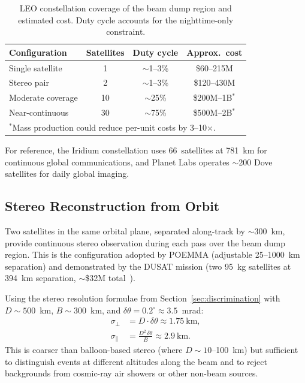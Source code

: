 \documentclass[11pt]{article}
\begin{document}
\begin{table}[h]
\centering
\small
\begin{tabular}{lccc}
\toprule
\textbf{Configuration} & \textbf{Satellites} &
\textbf{Duty cycle} & \textbf{Approx.\ cost} \\
\midrule
Single satellite     & 1  & $\sim$1--3\%  & \$60--215M \\
Stereo pair          & 2  & $\sim$1--3\%  & \$120--430M \\
Moderate coverage    & 10 & $\sim$25\%    & \$200M--1B$^*$ \\
Near-continuous      & 30 & $\sim$75\%    & \$500M--2B$^*$ \\
\bottomrule
\multicolumn{4}{l}{\footnotesize $^*$Mass production could reduce
per-unit costs by 3--10$\times$.}
\end{tabular}
\caption{LEO constellation coverage of the beam dump region
and estimated cost.  Duty cycle accounts for the nighttime-only
constraint.}
\label{tab:leo_coverage}
\end{table}

For reference, the Iridium constellation uses 66~satellites at 781~km
for continuous global communications, and Planet Labs operates
$\sim$200 Dove satellites for daily global imaging.

\subsection{Stereo Reconstruction from Orbit}

Two satellites in the same orbital plane, separated along-track by
$\sim$300~km, provide continuous stereo observation during each
pass over the beam dump region.  This is the configuration adopted
by POEMMA (adjustable 25--1000~km separation) and demonstrated by
the DUSAT mission (two 95~kg satellites at 394~km
separation, $\sim$\$32M total~\cite{DUSAT}).

Using the stereo resolution formulae from
Section~\ref{sec:discrimination} with $D \sim 500$~km,
$B \sim 300$~km, and $\delta\theta = 0.2^\circ \approx 3.5$~mrad:
\begin{align}
  \sigma_\perp &= D \cdot \delta\theta
    \approx 1.75~\text{km}, \\
  \sigma_\parallel &= \frac{D^2\,\delta\theta}{B}
    \approx 2.9~\text{km}.
\end{align}
This is coarser than balloon-based stereo (where $D \sim 10$--100~km)
but sufficient to distinguish events at different altitudes along the
beam and to reject backgrounds from cosmic-ray air showers or other
non-beam sources.
\end{document}
